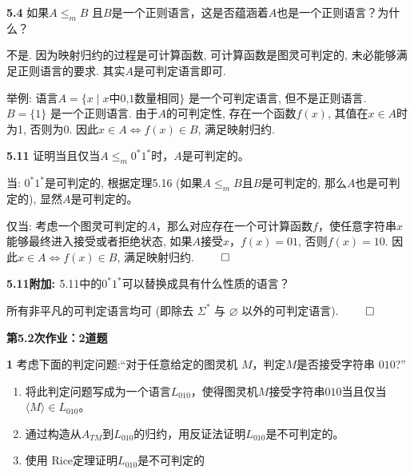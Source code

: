 \documentclass[UTF8]{report}
\newcommand{\problem}[1]{{\setlength{\parskip}{10pt}\noindent \bf{#1}}}
\newenvironment{solution}{{\noindent\hskip 2em \bf 解 \quad}}{}
\renewenvironment{proof}{{\setlength{\parskip}{7pt}\noindent\hskip 2em \bf 证明 \quad}}{\hfill$\qed$\par}
\begin{document}
\problem{5.4} 如果$A \leq_m B$ 且$B$是一个正则语言，这是否蕴涵着$A$也是一个正则语言？为什么？

\begin{solution}
    不是. 因为映射归约的过程是可计算函数, 可计算函数是图灵可判定的, 未必能够满足正则语言的要求. 其实$A$是可判定语言即可.

    举例: 语言$A=\{ x \mid x\text{中0,1数量相同} \}$ 是一个可判定语言, 但不是正则语言. $B=\{1 \}$ 是一个正则语言. 由于$A$的可判定性, 存在一个函数$f(x)$, 其值在$x\in A$时为1, 否则为0. 因此$x \in A \Longleftrightarrow f(x) \in B$, 满足映射归约.
\end{solution}

\problem{5.11} 证明当且仅当$A \leq_m 0^*1^*$时，$A$是可判定的。

\begin{proof}
    当: $0^*1^*$是可判定的, 根据定理5.16 (如果$A\leq_m B$且$B$是可判定的, 那么$A$也是可判定的), 显然$A$是可判定的。

    仅当: 考虑一个图灵可判定的$A$，那么对应存在一个可计算函数$f$，使任意字符串$x$能够最终进入接受或者拒绝状态, 如果$A$接受$x$，$f(x) = 01$, 否则$f(x) = 10$. 因此$x \in A \Longleftrightarrow f(x) \in B$, 满足映射归约.
\end{proof}

\problem{5.11附加: } 5.11中的$0^*1^*$可以替换成具有什么性质的语言？

\begin{proof}
    所有非平凡的可判定语言均可 (即除去 $\Sigma^*$ 与 $\varnothing$ 以外的可判定语言).
\end{proof}




\textbf{第5.2次作业：2道题}


\problem{1} 考虑下面的判定问题:``对于任意给定的图灵机 $M$，判定$M$是否接受字符串 $010$?''
\begin{enumerate}[label={(\alph*)}]
    \item 将此判定问题写成为一个语言$L_{010}$，使得图灵机$M$接受字符串$010$当且仅当$\langle M \rangle \in L_{010}$。
    \item 通过构造从$A_{TM}$到$L_{010}$的归约，用反证法证明$L_{010}$是不可判定的。
    \item 使用 Rice定理证明$L_{010}$是不可判定的
\end{enumerate}
\end{document}
